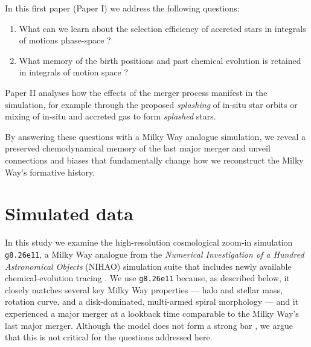 \documentclass[fleqn,usenatbib]{mnras}
\begin{document}
In this first paper (Paper I) we address the following questions: 
\begin{enumerate}[leftmargin=2em,labelwidth=0em]
    \item What can we learn about the selection efficiency of accreted stars in integrals of motions phase-space \citep{Helmi2018, Feuillet2021, Buder2022, Monty2024}?
    \item What memory of the birth positions and past chemical evolution is retained in integrals of motion space \citep{Skuladottir2025}?
\end{enumerate}

Paper II analyses how the effects of the merger process manifest in the simulation, for example through the proposed \textit{splashing} of in-situ star orbits \citep{Belokurov2020} or mixing of in-situ and accreted gas to form \textit{splashed} stars.

By answering these questions with a Milky Way analogue simulation, we reveal a preserved chemodynamical memory of the last major merger and unveil connections and biases that fundamentally change how we reconstruct the Milky Way's formative history.

\section{Simulated data} \label{sec:data}

In this study we examine the high-resolution cosmological zoom-in simulation \texttt{g8.26e11}, a Milky Way analogue from the \textit{Numerical Investigation of a Hundred Astronomical Objects} (NIHAO) simulation suite \citep{Wang2015} that includes newly available chemical-evolution tracing \citep{Buck2021}.
We use \texttt{g8.26e11} because, as described below, it closely matches several key Milky Way properties — halo and stellar mass, rotation curve, and a disk-dominated, multi-armed spiral morphology — and it experienced a major merger at a lookback time comparable to the Milky Way's last major merger.
Although the model does not form a strong bar \citep[see][]{Buder2025}, we argue that this is not critical for the questions addressed here.
\end{document}
